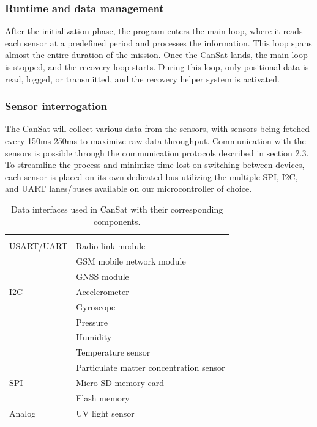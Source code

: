 \documentclass[11pt]{article}
\begin{document}
\subsubsection{Runtime and data management}
After the initialization phase, the program enters the main loop, where it reads each sensor at a predefined period and processes the information. This loop spans almost the entire duration of the mission. Once the CanSat lands, the main loop is stopped, and the recovery loop starts. During this loop, only positional data is read, logged, or transmitted, and the recovery helper system is activated.

\subsubsection{Sensor interrogation}
The CanSat will collect various data from the sensors, with sensors being fetched every 150ms-250ms to maximize raw data throughput. Communication with the sensors is possible through the communication protocols described in section 2.3. To streamline the process and minimize time lost on switching between devices, each sensor is placed on its own dedicated bus utilizing the multiple SPI, I2C, and UART lanes/buses available on our microcontroller of choice.

\begin{table}[ht]
\centering
{}
\begin{tabular}{ll}
\rowcolor{DeepSkyBlue4}
\hline
\textbf{\color{white!50}{Data Interface}} & \textbf{\color{white!50}{Components}} \\ \hline
USART/UART & Radio link module \\
& GSM mobile network module\\
& GNSS module \\ 
\rowcolor{LightCyan1!50}I2C & Accelerometer \\
\rowcolor{LightCyan1!50}& Gyroscope\\
\rowcolor{LightCyan1!50}& Pressure\\
\rowcolor{LightCyan1!50}& Humidity \\
\rowcolor{LightCyan1!50}& Temperature sensor \\
\rowcolor{LightCyan1!50}& Particulate matter concentration sensor \\ 
SPI & Micro SD memory card \\
& Flash memory \\ 
\rowcolor{LightCyan1!50}Analog & UV light sensor \\ \hline
\end{tabular}
\caption{\small{Data interfaces used in CanSat with their corresponding components.}}
\label{tab:data-interfaces}
\end{table}
\end{document}
